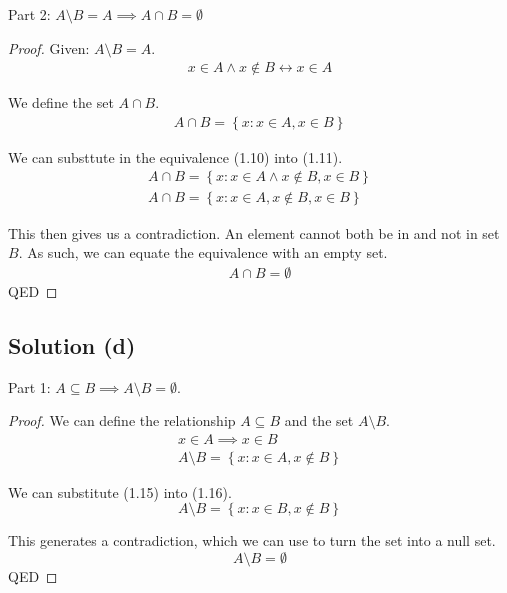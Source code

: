 \documentclass[12pt]{report}
\begin{document}
Part 2: $A \setminus B = A \implies A \cap B = \emptyset$
\begin{proof}
    Given: $A \setminus B = A$.
    \begin{gather}
        x \in A \land x \notin B \leftrightarrow x \in A
    \end{gather}
    
    We define the set $A \cap B$.
    \begin{gather}
        A \cap B = \left\{x: x \in A, x \in B\right\}
    \end{gather}

    We can substtute in the equivalence (1.10) into (1.11).
    \begin{gather}
        A \cap B = \left\{x: x \in A \land x \notin B, x \in B\right\}\\
        A \cap B = \left\{x: x \in A, x \notin B, x \in B\right\}
    \end{gather}

    This then gives us a contradiction. An element cannot both be in and not in set $B$. 
    As such, we can equate the equivalence with an empty set.
    \begin{gather}
        A \cap B = \emptyset
    \end{gather}
    QED
\end{proof}

\subsection{Solution (d)}
Part 1: $A \subseteq B \implies A \setminus B = \emptyset$.
\begin{proof}
    We can define the relationship $A \subseteq B$ and the set $A \setminus B$.
    \begin{gather}
        x \in A \implies x \in B\\
        A \setminus B = \left\{x:x \in A, x \notin B\right\}
    \end{gather}

    We can substitute (1.15) into (1.16).
    \begin{equation}
        A \setminus B = \left\{x: x \in B, x \notin B\right\}
    \end{equation}

    This generates a contradiction, which we can use to turn the set into a null set.
    \begin{equation}
        A \setminus B = \emptyset
    \end{equation}
    QED
\end{proof}
\end{document}
